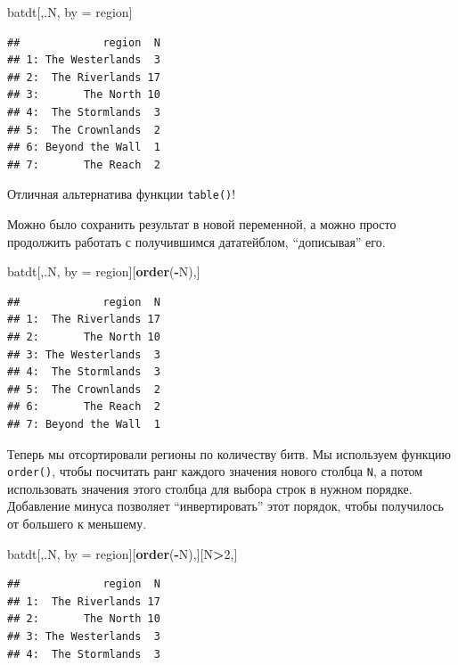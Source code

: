 \documentclass[]{book}
\newenvironment{Shaded}{\begin{snugshade}}{\end{snugshade}}
\newcommand{\KeywordTok}[1]{\textcolor[rgb]{0.13,0.29,0.53}{\textbf{#1}}}
\newcommand{\DecValTok}[1]{\textcolor[rgb]{0.00,0.00,0.81}{#1}}
\newcommand{\StringTok}[1]{\textcolor[rgb]{0.31,0.60,0.02}{#1}}
\newcommand{\OperatorTok}[1]{\textcolor[rgb]{0.81,0.36,0.00}{\textbf{#1}}}
\newcommand{\NormalTok}[1]{#1}
\begin{document}
\begin{Shaded}
\begin{Highlighting}[]
\NormalTok{batdt[,.N, by =}\StringTok{ }\NormalTok{region]}
\end{Highlighting}
\end{Shaded}

\begin{verbatim}
##             region  N
## 1: The Westerlands  3
## 2:  The Riverlands 17
## 3:       The North 10
## 4:  The Stormlands  3
## 5:  The Crownlands  2
## 6: Beyond the Wall  1
## 7:       The Reach  2
\end{verbatim}

Отличная альтернатива функции \texttt{table()}!

Можно было сохранить результат в новой переменной, а можно просто
продолжить работать с получившимся дататейблом, ``дописывая'' его.

\begin{Shaded}
\begin{Highlighting}[]
\NormalTok{batdt[,.N, by =}\StringTok{ }\NormalTok{region][}\KeywordTok{order}\NormalTok{(}\OperatorTok{-}\NormalTok{N),]}
\end{Highlighting}
\end{Shaded}

\begin{verbatim}
##             region  N
## 1:  The Riverlands 17
## 2:       The North 10
## 3: The Westerlands  3
## 4:  The Stormlands  3
## 5:  The Crownlands  2
## 6:       The Reach  2
## 7: Beyond the Wall  1
\end{verbatim}

Теперь мы отсортировали регионы по количеству битв. Мы используем
функцию \texttt{order()}, чтобы посчитать ранг каждого значения нового
столбца \texttt{N}, а потом использовать значения этого столбца для
выбора строк в нужном порядке. Добавление минуса позволяет
``инвертировать'' этот порядок, чтобы получилось от большего к меньшему.

\begin{Shaded}
\begin{Highlighting}[]
\NormalTok{batdt[,.N, by =}\StringTok{ }\NormalTok{region][}\KeywordTok{order}\NormalTok{(}\OperatorTok{-}\NormalTok{N),][N}\OperatorTok{>}\DecValTok{2}\NormalTok{,]}
\end{Highlighting}
\end{Shaded}

\begin{verbatim}
##             region  N
## 1:  The Riverlands 17
## 2:       The North 10
## 3: The Westerlands  3
## 4:  The Stormlands  3
\end{verbatim}
\end{document}

